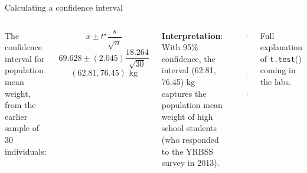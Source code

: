 \documentclass[
  ignorenonframetext,
  aspectratio=169]{beamer}
\newenvironment{Shaded}{\begin{snugshade}}{\end{snugshade}}
\newcommand{\CommentTok}[1]{\textcolor[rgb]{0.56,0.35,0.01}{\textit{#1}}}
\newcommand{\FunctionTok}[1]{\textcolor[rgb]{0.13,0.29,0.53}{\textbf{#1}}}
\newcommand{\NormalTok}[1]{#1}
\newcommand{\SpecialCharTok}[1]{\textcolor[rgb]{0.81,0.36,0.00}{\textbf{#1}}}
\newcommand{\columnsbegin}{\begin{columns}}
\newcommand{\columnsend}{\end{columns}}
\begin{document}
\begin{frame}[fragile]{Calculating a confidence interval}
\protect\hypertarget{calculating-a-confidence-interval}{}
\columnsbegin


\footnotesize

The confidence interval for population mean weight, from the earlier
sample of 30 individuals:

\[\overline{x} \pm t^\star \frac{s}{\sqrt{n}} \]
\[69.628 \pm (2.045)\frac{18.264}{\sqrt{30}}\]
\[(62.81, 76.45) \text{ kg} \]

\vspace{0.5cm}

\textbf{Interpretation}: With 95\% confidence, the interval (62.81,
76.45) kg captures the population mean weight of high school students
(who responded to the YRBSS survey in 2013).


\scriptsize

\begin{Shaded}
\end{Shaded}

\begin{verbatim}
## [1] 62.80802 76.44798
## attr(,"conf.level")
## [1] 0.95
\end{verbatim}

\vspace{0.5cm}

\footnotesize

Full explanation of \texttt{t.test}() coming in the labs.

\columnsend
\end{frame}
\end{document}
